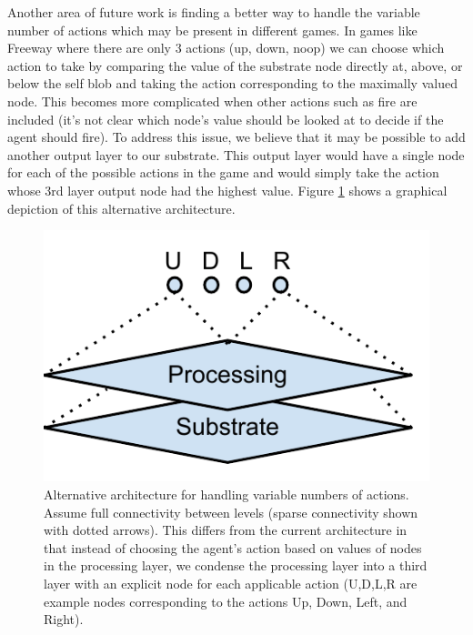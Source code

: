 \documentclass{acm_proc_article-sp}
\begin{document}
Another area of future work is finding a better way to handle the variable number of actions which may be present in different games. In games like Freeway where there are only 3 actions (up, down, noop) we can choose which action to take by comparing the value of the substrate node directly at, above, or below the self blob and taking the action corresponding to the maximally valued node. This becomes more complicated when other actions such as fire are included (it's not clear which node's value should be looked at to decide if the agent should fire). To address this issue, we believe that it may be possible to add another output layer to our substrate. This output layer would have a single node for each of the possible actions in the game and would simply take the action whose 3rd layer output node had the highest value. Figure \ref{fig:possiblearch} shows a graphical depiction of this alternative architecture.

\begin{figure}[htp]
\begin{center}
\includegraphics[width=\columnwidth]{figures/possiblearch}
\end{center}
\caption{Alternative architecture for handling variable numbers of actions. Assume full connectivity between levels (sparse connectivity shown with dotted arrows). This differs from the current architecture in that instead of choosing the agent's action based on values of nodes in the processing layer, we condense the processing layer into a third layer with an explicit node for each applicable action (U,D,L,R are example nodes corresponding to the actions Up, Down, Left, and Right).}
\label{fig:possiblearch}
\end{figure}
\end{document}

